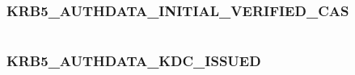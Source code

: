\documentclass[letterpaper,10pt,english]{sphinxmanual}
\begin{document}
\begin{fulllineitems}
\label{appdev/refs/macros/KRB5_AUTHDATA_IF_RELEVANT:KRB5_AUTHDATA_IF_RELEVANT}
\end{fulllineitems}


\begin{tabulary}{\linewidth}{|L|L|}
\hline

 & 
\\
\hline\end{tabulary}



\subsubsection{KRB5\_AUTHDATA\_INITIAL\_VERIFIED\_CAS}
\label{appdev/refs/macros/KRB5_AUTHDATA_INITIAL_VERIFIED_CAS:krb5-authdata-initial-verified-cas-data}\label{appdev/refs/macros/KRB5_AUTHDATA_INITIAL_VERIFIED_CAS:krb5-authdata-initial-verified-cas}\label{appdev/refs/macros/KRB5_AUTHDATA_INITIAL_VERIFIED_CAS::doc}

\begin{fulllineitems}
\label{appdev/refs/macros/KRB5_AUTHDATA_INITIAL_VERIFIED_CAS:KRB5_AUTHDATA_INITIAL_VERIFIED_CAS}
\end{fulllineitems}


\begin{tabulary}{\linewidth}{|L|L|}
\hline

 & 
\\
\hline\end{tabulary}



\subsubsection{KRB5\_AUTHDATA\_KDC\_ISSUED}
\label{appdev/refs/macros/KRB5_AUTHDATA_KDC_ISSUED:krb5-authdata-kdc-issued-data}\label{appdev/refs/macros/KRB5_AUTHDATA_KDC_ISSUED::doc}\label{appdev/refs/macros/KRB5_AUTHDATA_KDC_ISSUED:krb5-authdata-kdc-issued}

\begin{fulllineitems}
\label{appdev/refs/macros/KRB5_AUTHDATA_KDC_ISSUED:KRB5_AUTHDATA_KDC_ISSUED}
\end{fulllineitems}
\end{document}
